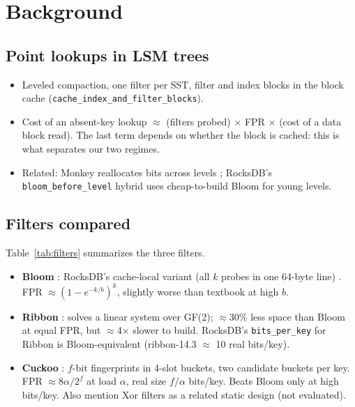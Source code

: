 \documentclass[sigconf,nonacm]{acmart}
\begin{document}
\section{Background}
\label{sec:background}

\subsection{Point lookups in LSM trees}
\begin{itemize}
  \item Leveled compaction, one filter per SST, filter and index blocks in the
    block cache (\texttt{cache\_index\_and\_filter\_blocks}).
  \item Cost of an absent-key lookup $\approx$ (filters probed) $\times$ FPR
    $\times$ (cost of a data block read). The last term depends on whether
    the block is cached: this is what separates our two regimes.
  \item Related: Monkey reallocates bits across levels \cite{dayan2017monkey};
    RocksDB's \texttt{bloom\_before\_level} hybrid uses cheap-to-build Bloom
    for young levels.
\end{itemize}

\subsection{Filters compared}
Table~\ref{tab:filters} summarizes the three filters.
\begin{itemize}
  \item \textbf{Bloom} \cite{bloom1970}: RocksDB's cache-local variant
    (all $k$ probes in one 64-byte line) \cite{putze2009cacheefficient}.
    FPR $\approx (1-e^{-k/b})^k$, slightly worse than textbook at high $b$.
  \item \textbf{Ribbon} \cite{dillinger2021ribbon}: solves a linear system
    over GF(2); $\approx$30\% less space than Bloom at equal FPR, but
    $\approx$4$\times$ slower to build. RocksDB's \texttt{bits\_per\_key} for
    Ribbon is Bloom-equivalent (ribbon-14.3 $\approx$ 10 real bits/key).
  \item \textbf{Cuckoo} \cite{fan2014cuckoo}: $f$-bit fingerprints in
    4-slot buckets, two candidate buckets per key. FPR $\approx 8\alpha/2^f$
    at load $\alpha$, real size $f/\alpha$ bits/key. Beats Bloom only at
    high bits/key. Also mention Xor filters \cite{graf2020xor} as a related
    static design (not evaluated).
\end{itemize}
\end{document}
